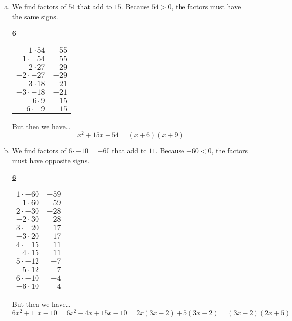\documentclass[12pt,letterpaper]{exam}
\begin{document}
\begin{questions}
\sol 
\begin{enumerate}[(a)]
\item We find factors of $54$ that add to $15$. Because $54 > 0$, the factors must have the same signs. 
	\begin{table}[!ht]
	\centering
	\underline{\bfseries 6} \pvspace{0.2cm}
	\begin{tabular}{rr}
	$1 \cdot 54$ & $55$ \\
	$-1 \cdot -54$ & $-55$ \\
	$2 \cdot 27$ & $29$ \\
	$-2 \cdot -27$ & $-29$ \\
	$3 \cdot 18$ & $21$ \\
	$-3 \cdot -18$ & $-21$ \\ \hline
	\multicolumn{1}{|r}{$6 \cdot 9$} & \multicolumn{1}{r|}{$15$} \\ \hline
	$-6 \cdot -9$ & $-15$ 
	\end{tabular}
	\end{table}
But then we have\dots
	\[
	x^2 + 15x + 54= (x + 6)(x + 9)
	\] \pspace

\item We find factors of $6 \cdot -10= -60$ that add to $11$. Because $-60 < 0$, the factors must have opposite signs. 
	\begin{table}[!ht]
	\centering
	\underline{\bfseries 6} \pvspace{0.2cm}
	\begin{tabular}{rr}
	$1 \cdot -60$ & $-59$ \\
	$-1 \cdot 60$ & $59$ \\
	$2 \cdot -30$ & $-28$ \\
	$-2 \cdot 30$ & $28$ \\
	$3 \cdot -20$ & $-17$ \\
	$-3 \cdot 20$ & $17$ \\
	$4 \cdot -15$ & $-11$ \\ \hline
	\multicolumn{1}{|r}{$-4 \cdot 15$} & \multicolumn{1}{r|}{$11$} \\ \hline
	$5 \cdot -12$ & $-7$ \\
	$-5 \cdot 12$ & $7$ \\
	$6 \cdot -10$ & $-4$ \\
	$-6 \cdot 10$ & $4$ 
	\end{tabular}
	\end{table}
But then we have\dots
	\[
	6x^2 + 11x - 10= 6x^2 - 4x + 15x - 10= 2x(3x - 2) + 5(3x - 2)= (3x - 2)(2x + 5)
	\] 
\end{enumerate}




\end{questions}
\end{document}
